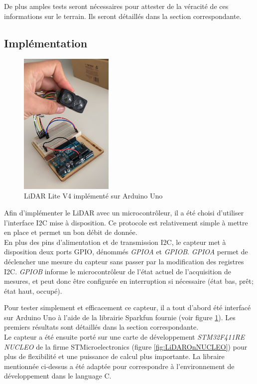 De plus amples tests seront nécessaires pour attester de la véracité de ces informations sur le
terrain. Ils seront détaillés dans la section correspondante.

\subsection{Implémentation}

\begin{figure}[H]
    \centering
    \includegraphics[width=0.4\textwidth]{Images/LiDAR/LiDAROnArduino.jpeg}
    \caption{LiDAR Lite V4 implémenté sur Arduino Uno}
    \label{fig:LiDAROnArduino}
\end{figure}

Afin d'implémenter le LiDAR avec un microcontrôleur, il a été choisi d'utiliser l'interface I2C
mise à disposition. Ce protocole est relativement simple à mettre en place et permet un bon débit de
donnée.\\
En plus des pins d'alimentation et de transmission I2C, le capteur met à disposition deux ports GPIO,
dénommés \emph{GPIOA} et \emph{GPIOB}. \emph{GPIOA} permet de déclencher une mesure du capteur sans
passer par la modification des registres I2C. \emph{GPIOB} informe le microcontrôleur de l'état actuel
de l'acquisition de mesures, et peut donc être configurée en interruption si nécessaire (état bas, prêt;
état haut, occupé).\par
Pour tester simplement et efficacement ce capteur, il a tout d'abord été interfacé sur Arduino Uno
à l'aide de la librairie Sparkfun fournie (voir figure \ref{fig:LiDAROnArduino}). Les premiers résultats 
sont détaillés dans la section correspondante.\\
Le capteur a été ensuite porté sur une carte de développement \emph{STM32F411RE NUCLEO} de la firme 
STMicroelectronics (figure \ref{fig:LiDAROnNUCLEO}) pour plus de flexibilité et une puissance de calcul plus importante. La libraire
mentionnée ci-dessus a été adaptée pour correspondre à l'environnement de développement dans le language
C.

